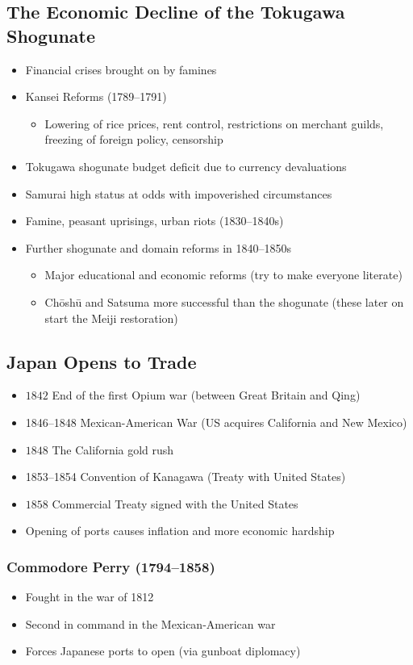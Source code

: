 \documentclass[class=article, crop=false]{standalone}
\begin{document}
  \subsection{The Economic Decline of the Tokugawa Shogunate}
  \begin{itemize}
    \item Financial crises brought on by famines
    \item Kansei Reforms (1789--1791)
    \begin{itemize}
      \item Lowering of rice prices, rent control, restrictions on merchant guilds, freezing of foreign policy, censorship
    \end{itemize}
    \item Tokugawa shogunate budget deficit due to currency devaluations
    \item Samurai high status at odds with impoverished circumstances
    \item Famine, peasant uprisings, urban riots (1830--1840s)
    \item Further shogunate and domain reforms in 1840--1850s
    \begin{itemize}
      \item Major educational and economic reforms (try to make everyone literate)
      \item Ch\=osh\=u and Satsuma more successful than the shogunate (these later on start the Meiji restoration)
    \end{itemize}
  \end{itemize}
  \subsection{Japan Opens to Trade}
  \begin{itemize}
    \item $1842$ End of the first Opium war (between Great Britain and Qing)
    \item 1846--1848 Mexican-American War (US acquires California and New Mexico)
    \item $1848$ The California gold rush
    \item 1853--1854 Convention of Kanagawa (Treaty with United States)
    \item $1858$ Commercial Treaty signed with the United States
    \item Opening of ports causes inflation and more economic hardship
  \end{itemize}
  \subsubsection{Commodore Perry (1794--1858)}
  \begin{itemize}
    \item Fought in the war of 1812
    \item Second in command in the Mexican-American war
    \item Forces Japanese ports to open (via gunboat diplomacy)
  \end{itemize}
\end{document}

